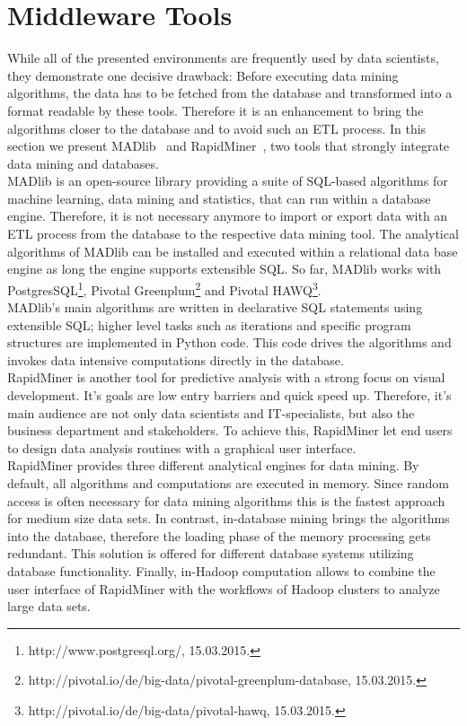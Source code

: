 \section{Middleware Tools}
While all of the presented environments are frequently used by data scientists, they demonstrate one decisive drawback: Before executing data mining algorithms, the data has to be fetched from the database and transformed into a format readable by these tools. Therefore it is an enhancement to bring the algorithms closer to the database and to avoid such an ETL process. In this section we present MADlib~\parencite{MADlib} and RapidMiner~\parencite{rapidminer}, two tools that strongly integrate data mining and databases.
\\
MADlib is an open-source library providing a suite of SQL-based algorithms for machine learning, data mining and statistics, that can run within a database engine. Therefore, it is not necessary anymore to import or export data with an ETL process from the database to the respective data mining tool. The analytical algorithms of MADlib can be installed and executed within a relational data base engine as long the engine supports extensible SQL. So far, MADlib works with PostgresSQL\footnote{http://www.postgresql.org/, 15.03.2015.}, Pivotal Greenplum\footnote{http://pivotal.io/de/big-data/pivotal-greenplum-database, 15.03.2015.} and Pivotal HAWQ\footnote{http://pivotal.io/de/big-data/pivotal-hawq, 15.03.2015.}.
\\
MADlib's main algorithms are written in declarative SQL statements using extensible SQL; higher level tasks such as iterations and specific program structures are implemented in Python code. This code drives the algorithms and invokes data intensive computations directly in the database.
\\
RapidMiner is another tool for predictive analysis with a strong focus on visual development. It's goals are low entry barriers and quick speed up. Therefore, it's main audience are not only data scientists and IT-specialists, but also the business department and stakeholders. To achieve this, RapidMiner let end users to design data analysis routines with a graphical user interface.
\\
RapidMiner provides three different analytical engines for data mining. By default, all algorithms and computations are executed in memory. Since random access is often necessary for data mining algorithms this is the fastest approach for medium size data sets. In contrast, in-database mining brings the algorithms into the database, therefore the loading phase of the memory processing gets redundant. This solution is offered for different database systems utilizing database functionality. Finally, in-Hadoop computation allows to combine the user interface of RapidMiner with the workflows of Hadoop clusters to analyze large data sets.
